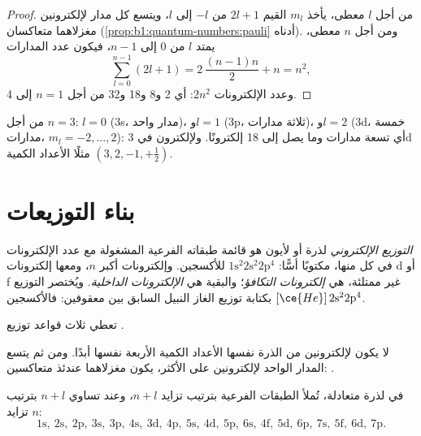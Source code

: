\begin{proof}
من أجل $l$ معطى، يأخذ $m_l$ القيم $2l + 1$ من $-l$ إلى $l$، ويتسع كل
مدار لإلكترونين مغزلاهما متعاكسان (\cref{prop:b1:quantum-numbers:pauli}
أدناه). ومن أجل $n$ معطى، يمتد $l$ من $0$ إلى $n - 1$، فيكون عدد
المدارات
\[
  \sum_{l=0}^{n-1} (2l+1) = 2\,\frac{(n-1)n}{2} + n = n^2 ,
\]
وعدد الإلكترونات $2n^2$: أي 2 و8 و18 و32 من أجل $n = 1$ إلى 4.
\end{proof}

\begin{example}\label{ex:b1:quantum-numbers:third}
من أجل $n = 3$: $l = 0$ (3s، مدار واحد)، و$l = 1$ (3p، ثلاثة مدارات)،
و$l = 2$ (3d، خمسة مدارات، $m_l = -2, \dots, 2$): أي تسعة مدارات وما
يصل إلى 18 إلكترونًا. ولإلكترون في 3d مثلًا الأعداد
الكمية $(3, 2, -1, +\tfrac12)$.
\end{example}

\section{بناء التوزيعات}

\begin{definition}\label{def:b1:quantum-numbers:configuration}
\emph{التوزيع الإلكتروني} لذرة أو لأيون هو قائمة
طبقاته الفرعية المشغولة مع عدد الإلكترونات في كل منها، مكتوبًا أسًّا:
$1\text{s}^2 2\text{s}^2
2\text{p}^4$ للأكسجين. وإلكترونات أكبر $n$، ومعها إلكترونات  d
أو f غير ممتلئة، هي \emph{إلكترونات
التكافؤ}؛ والبقية هي \emph{الإلكترونات
الداخلية}. ويُختصر التوزيع بكتابة توزيع الغاز
النبيل السابق بين معقوفين:
فالأكسجين $[\ce{He}]\,2\text{s}^2 2\text{p}^4$.
\end{definition}

تعطي ثلاث قواعد توزيع .

\begin{proposition}\label{prop:b1:quantum-numbers:pauli}
لا يكون لإلكترونين من الذرة نفسها الأعداد الكمية الأربعة نفسها أبدًا.
ومن ثم يتسع المدار الواحد لإلكترونين على الأكثر، يكون مغزلاهما عندئذ
متعاكسين: .
\end{proposition}
\admitted

\begin{proposition}\label{prop:b1:quantum-numbers:klechkowski}
في  لذرة متعادلة، تُملأ الطبقات الفرعية بترتيب
تزايد $n + l$، وعند تساوي $n + l$ بترتيب تزايد
$n$:
\[
  1\text{s},\ 2\text{s},\ 2\text{p},\ 3\text{s},\ 3\text{p},\ 4\text{s},\
  3\text{d},\ 4\text{p},\ 5\text{s},\ 4\text{d},\ 5\text{p},\ 6\text{s},\
  4\text{f},\ 5\text{d},\ 6\text{p},\ 7\text{s},\ 5\text{f},\ 6\text{d},\
  7\text{p}.
\]
\end{proposition}
\admitted

